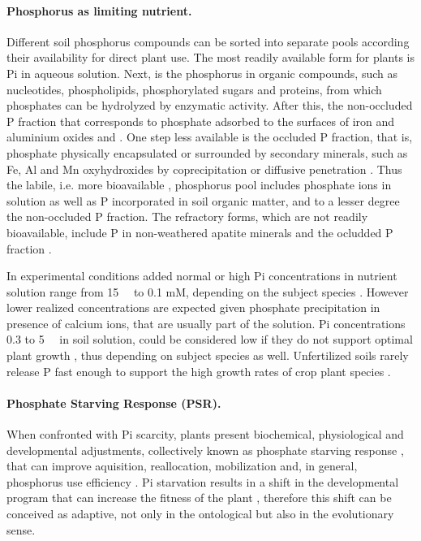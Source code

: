 \documentclass[10pt,letterpaper]{article}
\begin{document}
\paragraph{Phosphorus as limiting nutrient.} 

Different soil phosphorus compounds can be sorted into separate pools according their availability for direct plant use. The most readily available form for plants is Pi in aqueous solution. Next, is the phosphorus in organic compounds, such as nucleotides, phospholipids, phosphorylated sugars and proteins, from which phosphates can be hydrolyzed by enzymatic activity. After this, the non-occluded P fraction that corresponds to phosphate adsorbed to the surfaces of iron and aluminium oxides and  \cite{WALKER19761}. One step less available is the occluded P fraction, that is, phosphate physically encapsulated or surrounded by secondary minerals, such as Fe, Al and Mn oxyhydroxides \cite{Yang:2013ft,Filipelli:6Zj8wyph} by coprecipitation or diffusive penetration \cite{WALKER19761}. Thus the labile, i.e. more bioavailable \cite{Yang:2013ft}, phosphorus pool includes phosphate ions in solution as well as P incorporated in soil organic matter, and to a lesser degree the non-occluded P fraction. The refractory forms, which are not readily bioavailable, include P in non-weathered apatite minerals and the ocludded P fraction \cite{Filipelli:6Zj8wyph}. 

In experimental conditions added normal or high Pi concentrations in nutrient solution range from \SI{15}{\micro\molar} to 0.1 mM, depending on the subject species \cite{Scheible:2015hx}. However lower realized concentrations are expected given phosphate precipitation in presence of calcium ions, that are usually part of the solution. Pi concentrations 0.3 to \SI{5}{\micro\molar} in soil solution, could be considered low if they do not support optimal plant growth \cite{Scheible:2015hx,Schachtman:1998vv}, thus depending on subject species as well. Unfertilized soils rarely release P fast enough to support the high growth rates of crop plant species \cite{Schachtman:1998vv}.

\paragraph{Phosphate Starving Response (PSR).} 
When confronted with Pi scarcity, plants present biochemical, physiological and developmental adjustments, collectively known as phosphate starving response , that can improve aquisition, reallocation, mobilization and, in general, phosphorus use efficiency \cite{Scheible:2015hx}. Pi starvation results in a shift in the developmental program that can increase the fitness of the plant \cite{Peret:2011jd}, therefore this shift can be conceived as adaptive, not only in the ontological but also in the evolutionary sense.
\end{document}

